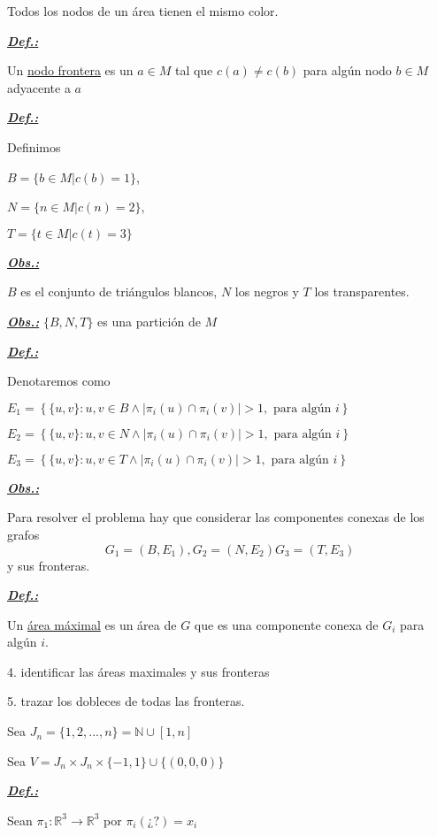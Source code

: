 \documentclass[a4paper, 10pt]{article}
\begin{document}
	Todos los nodos de un área tienen el mismo color.
	
	\textbf{\textit{\underline{Def.:}}}
	
	Un \underline{nodo frontera} es un $ a\in M $ tal que $ c(a)\neq c(b) $ para algún nodo $ b\in M $ adyacente a $ a $
	
	\textbf{\textit{\underline{Def.:}}}
	
	Definimos
	
	$ B=\{ b\in M | c(b)=1 \} $, 
	
	$ N=\{ n\in M | c(n)=2 \} $, 
	
	$ T=\{ t\in M | c(t)=3 \} $
	
	\textbf{\textit{\underline{Obs.:}}}
	
	$ B $ es el conjunto de triángulos blancos, $ N $ los negros y $ T $ los transparentes.
	
	\textbf{\textit{\underline{Obs.:}}}
	$ \{B, N, T\} $ es una partición de $ M $
	
	\textbf{\textit{\underline{Def.:}}}
	
	Denotaremos como
	
	$ E_1=\left\{ \{u, v\}: u,v\in B \wedge |\pi_i(u)\cap\pi_i(v)|>1,\mbox{ para algún }i \right\}  $
	
	$ E_2=\left\{ \{u, v\}: u,v\in N \wedge |\pi_i(u)\cap\pi_i(v)|>1,\mbox{ para algún }i \right\}  $
	
	$ E_3=\left\{ \{u, v\}: u,v\in T \wedge |\pi_i(u)\cap\pi_i(v)|>1,\mbox{ para algún }i \right\}  $
	
	
	\textbf{\textit{\underline{Obs.:}}} 
	
	Para resolver el problema hay que considerar las componentes conexas de los grafos
	$$ G_1=(B, E_1), G_2=(N, E_2) G_3=(T, E_3) $$
	y sus fronteras.
	
	\textbf{\textit{\underline{Def.:}}}
	
	Un \underline{área máximal} es un área de $ G $ que es una componente conexa de $ G_i $ para algún $ i $.
		
	4. identificar las áreas maximales y sus fronteras
	
	5. trazar los dobleces de todas las fronteras.
	
	
	Sea $ J_n=\{1,2,...,n\}=\mathbb{N}\cup [1,n] $
	 
	Sea $ V=J_n\times J_n\times \{-1,1\}\cup \{(0,0,0)\}  $
	
	\textbf{\textit{\underline{Def.:}}}
	
	Sean $ \pi_1:\mathbb{R}^3\longrightarrow\mathbb{R}^3 $ por $ \pi_i(¿?) =x_i$
	
\end{document}
